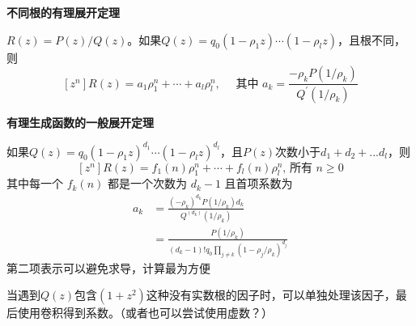 \noindent \textbf{不同根的有理展开定理}

$R(z) = P(z)/Q(z)$。如果$Q(z)=q_{0}\left(1-\rho_{1} z\right) \cdots\left(1-\rho_{l} z\right)$，且根不同，则
\setcounter{equation}{28}
\begin{equation}
    \left[z^{n}\right] R(z)=a_{1} \rho_{1}^{n}+\cdots+a_{l} \rho_{l}^{n}, \quad \text { 其中 } a_{k}=\frac{-\rho_{k} P\left(1 / \rho_{k}\right)}{Q^{\prime}\left(1 / \rho_{k}\right)}
\end{equation}

\noindent \textbf{有理生成函数的一般展开定理}

如果$Q(z)=q_{0}\left(1-\rho_{1} z\right)^{d_{1}} \cdots\left(1-\rho_{l} z\right)^{d_{l}}$，且$P(z)$次数小于$d_1+d_2+...d_l$，则
\begin{equation}
    \left[z^{n}\right] R(z)=f_{1}(n) \rho_{1}^{n}+\cdots+f_{l}(n) \rho_{l}^{n} \text {, 所有 } n \ge 0
\end{equation}
其中每一个 $f_{k}(n)$ 都是一个次数为 $d_{k}-1$ 且首项系数为
\begin{equation}
    \begin{aligned}
    a_{k} &=\frac{\left(-\rho_{k}\right)^{d_{k}} P\left(1 / \rho_{k}\right) d_{k}}{Q^{\left(d_{k}\right)}\left(1 / \rho_{k}\right)} \\
    &=\frac{P\left(1 / \rho_{k}\right)}{\left(d_{k}-1\right) ! q_{0} \prod_{j \neq k}\left(1-\rho_{j} / \rho_{k}\right)^{d_{j}}}
    \end{aligned}
\end{equation}
第二项表示可以避免求导，计算最为方便

当遇到$Q(z)$包含$(1+z^2)$这种没有实数根的因子时，可以单独处理该因子，最后使用卷积得到系数。（或者也可以尝试使用虚数？）

